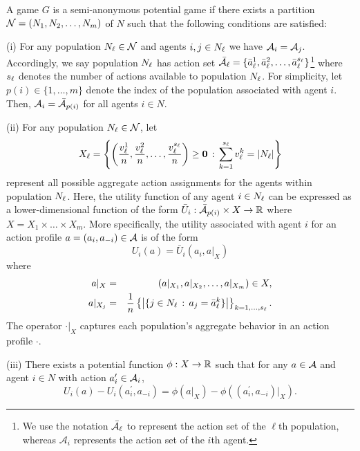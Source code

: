 \begin{defn}\label{d:semi-anon potential}
%
A game $G$ is a semi-anonymous potential game if there exists a partition ${\cal N} = (N_1, N_2, \dots, N_m)$ of $N$ such that the following conditions are satisfied:

\smallskip

\noindent (i)  For any population $N_{\ell} \in {\cal N}$ and agents $i,j \in N_{\ell}$ we have ${\cal A}_i = {\cal A}_j$.  Accordingly, we say population $N_{\ell}$ has action set $\bar{{\cal A}}_{\ell}= \{\bar{a}_{\ell}^1,\bar{a}_{\ell}^2,\ldots,\bar{a}_{\ell}^{s_{\ell}}\}$\footnote{We use the notation $\bar{{\cal A}}_\ell$ to represent the action set of the $\ell$th population, whereas $\mathcal{A}_i$ represents the action set of the $i$th agent.} where $s_{\ell}$ denotes the number of actions available to population $N_{\ell}$.  For simplicity, let $p(i) \in \{1, \dots, m\}$ denote the index of the population associated with agent $i$.  Then, ${\cal A}_i = \bar{{\cal A}}_{p(i)}$ for all agents $i \in N$. 

\smallskip

\noindent(ii) For any population $N_{\ell} \in {\cal N}$, let 
%
\begin{equation}
X_{\ell} = \left\{\left({v_{\ell}^1\over n},{v_{\ell}^2\over n},\ldots,{v_{\ell}^{s_{\ell}}\over n}\right) \geq \mathbf{0} \,:\, \sum_{k=1}^{s_{\ell}} v_{\ell}^k = |N_{\ell}| \right\}
\end{equation}
%
represent all possible aggregate action assignments for the agents within population $N_{\ell}$.  Here, the utility function of any agent $i \in N_{\ell}$ can be expressed as a lower-dimensional function of the form $\bar{U}_i : \bar{{\cal A}}_{p(i)} \times X \rightarrow \mathbb{R}$ where $X = X_{1} \times \dots \times X_m$.  More specifically, the utility associated with agent $i$ for an action profile $a = (a_i,a_{-i}) \in {\cal A}$ is of the form $$U_i(a) = \bar{U}_i(a_i,a|_{X})$$ where
%
\begin{eqnarray}
a|_{X} &=& (a|_{X_1}, a|_{X_2},\ldots,a|_{X_m})\in X, \\
a|_{X_j} &=& \frac{1}{n}\left\{\left|\{j\in N_{\ell} \,:\, a_j = \bar{a}_{\ell}^k\}\right|\right\}_{k=1,\ldots,s_{\ell}}.
\end{eqnarray}
%
The operator $\cdot|_X$ captures each population's aggregate behavior in an action profile $\cdot$. 

\smallskip

\noindent(iii) There exists a potential function $\phi: X \to\mathbb{R}$ such that for any $a \in {\cal A}$ and agent $i \in N$ with action $a_i' \in {\cal A}_i$,
\small
\begin{equation}U_i(a) - U_i(a_i^{\prime},a_{-i}) = \phi(a|_X) - \phi((a_i^{\prime},a_{-i})|_X).\end{equation}
\normalsize
\end{defn}

